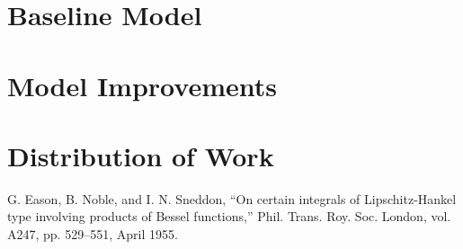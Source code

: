 \documentclass[conference]{IEEEtran}
\begin{document}
\section{Baseline Model}

\section{Model Improvements}

\section{Distribution of Work}

\begin{thebibliography}{00}
 G. Eason, B. Noble, and I. N. Sneddon, ``On certain integrals of Lipschitz-Hankel type involving products of Bessel functions,'' Phil. Trans. Roy. Soc. London, vol. A247, pp. 529--551, April 1955.

\end{thebibliography}
\end{document}
